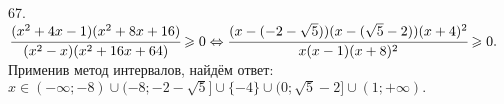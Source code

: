67. $\cfrac{(x^2+4x-1)(x^2+8x+16)}{(x^2-x)(x^2+16x+64)}\geqslant0\Leftrightarrow
\cfrac{(x-(-2-\sqrt{5}))(x-(\sqrt{5}-2))(x+4)^2}{x(x-1)(x+8)^2}\geqslant0.$ Применив метод интервалов, найдём ответ: $x\in
(-\infty;-8)\cup(-8;-2-\sqrt{5}]\cup\{-4\}\cup(0;\sqrt{5}-2]\cup(1;+\infty).$
\begin{figure}[ht!]
\end{figure}\\
